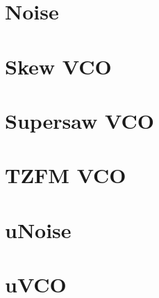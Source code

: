 \documentclass[11pt]{book}
\begin{document}
\section{Noise}
\section{Skew VCO}
\section{Supersaw VCO}
\section{TZFM VCO}
\section{uNoise}
\section{uVCO}
\end{document}
